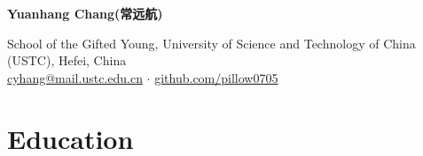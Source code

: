 \documentclass[11pt,a4paper]{article}
\begin{document}
\begin{center}
    {\Huge \textbf{Yuanhang Chang(常远航)}} 
    \par \vspace{0.2cm}
    \faMapMarker \hspace{0.5em} School of the Gifted Young, University of Science and Technology of China (USTC), Hefei, China \\
    \faEnvelope \hspace{0.5em} \href{mailto:cyhang@mail.ustc.edu.cn}{cyhang@mail.ustc.edu.cn} $\cdot$
    \faGithub \hspace{0.5em} \href{https://github.com/pillow0705}{github.com/pillow0705}
\end{center}

\vspace{0.1cm}

\section{Education}
\end{document}
